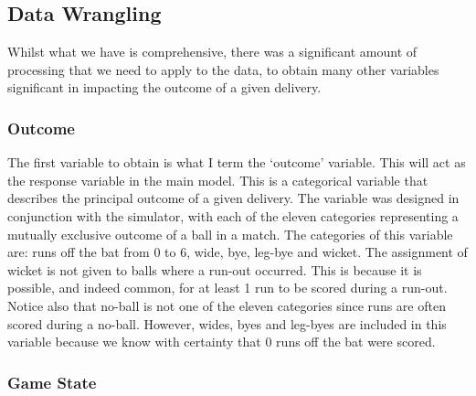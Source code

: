 \subsection{Data Wrangling}
\label{subsec: data wrangling}

Whilst what we have is comprehensive, there was a significant amount of processing that we need to apply to the data, to obtain many other variables significant in impacting the outcome of a given delivery.

\subsubsection{Outcome}

The first variable to obtain is what I term the ‘outcome’ variable. This will act as the response variable in the main model. This is a categorical variable that describes the principal\footnotemark{} outcome of a given delivery.  The variable was designed in conjunction with the simulator, with each of the eleven categories representing a mutually exclusive outcome of a ball in a match. The categories of this variable are: runs off the bat from 0 to 6, wide, bye, leg-bye and wicket. The assignment of wicket is not given to balls where a run-out occurred. This is because it is possible, and indeed common, for at least 1 run to be scored during a run-out. Notice also that no-ball is not one of the eleven categories since runs are often scored during a no-ball. However, wides, byes and leg-byes are included in this variable because we know with certainty that 0 runs off the bat were scored.


\subsubsection{Game State}

